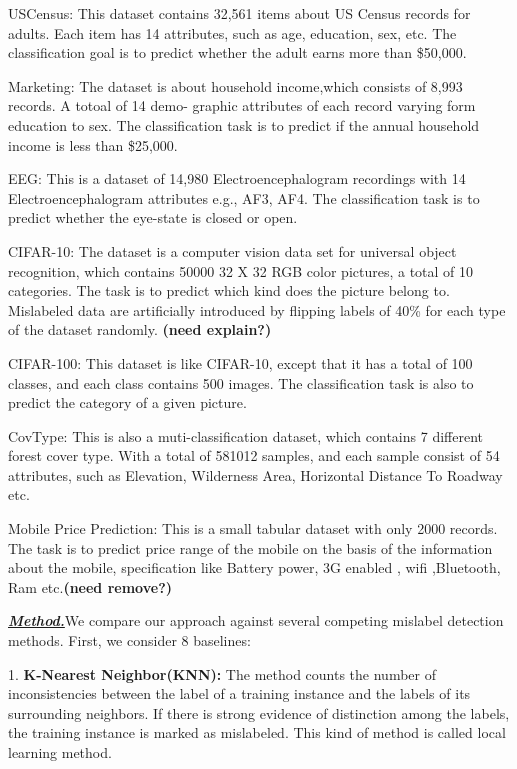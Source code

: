 \be
\item USCensus: This dataset contains 32,561 items about US Census records for adults. Each item has 14 attributes, such as age, education, sex, etc. The classification goal is to predict whether the adult earns more than \$50,000.
\item Marketing: The dataset is about household income,which consists of 8,993 records. A totoal of 14 demo- graphic attributes of each record varying form education to sex. The classification task is to predict if the annual household income is less than \$25,000. 
\item EEG: This is a dataset of 14,980 Electroencephalogram recordings with 14 Electroencephalogram attributes e.g., AF3, AF4. The classification task is to predict whether the eye-state is closed or open. 
\item CIFAR-10: The dataset is a computer vision data set for universal object recognition, which contains 50000 32 X 32 RGB color pictures, a total of 10 categories. The task is to predict which kind does the picture belong to. Mislabeled data are artificially introduced by flipping labels of 40\% for each type of the dataset randomly. \textbf{(need explain?)}
\item CIFAR-100: This dataset is like CIFAR-10, except that it has a total of 100 classes, and each class contains 500 images. The classification task is also to predict the category of a given picture.
\item CovType: This is also a muti-classification dataset, which contains 7 different forest cover type. With a total of 581012 samples, and each sample consist of 54 attributes, such as Elevation, Wilderness Area, Horizontal Distance To Roadway etc.
\item Mobile Price Prediction: This is a small tabular dataset with only 2000 records. The task is to predict price range of the mobile on the basis of the information about the mobile, specification like Battery power, 3G enabled , wifi ,Bluetooth, Ram etc.\textbf{(need remove?)}
\item {}
\ee
\textbf{\textit{\underline{Method.}}}We compare our approach against several competing mislabel detection methods. First, we consider 8 baselines:

1. \textbf{K-Nearest Neighbor(KNN):} The method counts the number of inconsistencies between the label of a training instance and the labels of its surrounding neighbors. If there is strong evidence of distinction among the labels, the training instance is marked as mislabeled. This kind of method is called local learning method.

